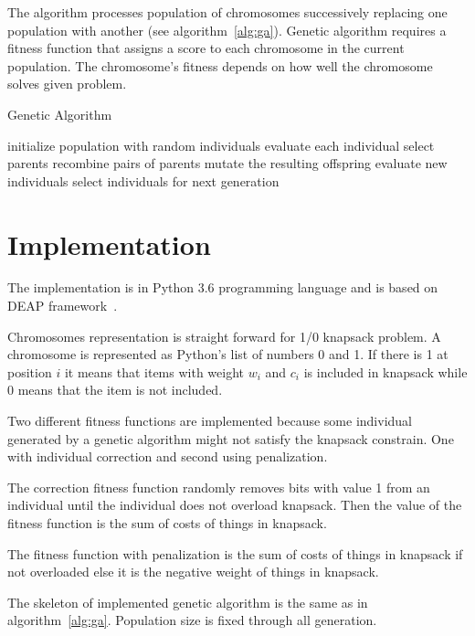 \documentclass{article}
\begin{document}
The algorithm processes population of chromosomes successively replacing
one population with another (see algorithm~\ref{alg:ga}).
Genetic algorithm requires a fitness function that assigns a score to
each chromosome in the current population.
The chromosome's fitness depends on how well the chromosome solves given
problem.
\cite{mitchell1996}

\begin{algorithm}[hb]
\caption{Genetic Algorithm~\cite{eiben2003}}
\label{alg:ga}
\begin{algorithmic}
\STATE initialize population with random individuals
\STATE evaluate each individual
\STATE select parents
\STATE recombine pairs of parents
\STATE mutate the resulting offspring
\STATE evaluate new individuals
\STATE select individuals for next generation
\ENDWHILE
\end{algorithmic}
\end{algorithm}

\section{Implementation}

The implementation is in Python 3.6 programming language
and is based on DEAP framework~\cite{fortin2012}.

Chromosomes representation is straight forward for 1/0 knapsack problem.
A chromosome is represented as Python's list of numbers 0 and 1.
If there is 1 at position $i$ it means that items with weight $w_i$ and $c_i$
is included in knapsack while 0 means that the item is not included.

Two different fitness functions are implemented
because some individual generated by a genetic algorithm might not satisfy
the knapsack constrain.
One with individual correction and second using penalization.

The correction fitness function randomly removes bits with value 1
from an individual until the individual does not overload knapsack.
Then the value of the fitness function is the sum of costs of things
in knapsack.

The fitness function with penalization is the sum of costs of things
in knapsack if not overloaded else it is the negative weight of things
in knapsack.

The skeleton of implemented genetic algorithm is the same as
in algorithm~\ref{alg:ga}.
Population size is fixed through all generation.
\end{document}
